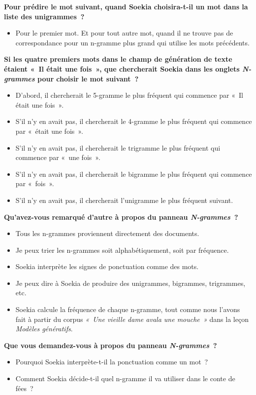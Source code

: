 \documentclass[12pt,a4paper]{article}
\begin{document}
\begin{thinkbox}
  \textbf{Pour prédire le mot suivant, quand Soekia choisira-t-il un mot dans la liste des unigrammes~?}
  \begin{itemize}
    \item Pour le premier mot. Et pour tout autre mot, quand il ne trouve pas de correspondance pour un n-gramme plus grand qui utilise les mots précédents.
  \end{itemize}

  \textbf{Si les quatre premiers mots dans le champ de génération de texte étaient «~Il était une fois~», que chercherait Soekia dans les onglets \emph{N-grammes} pour choisir le mot suivant~?}
  \begin{itemize}
    \item D'abord, il chercherait le 5-gramme le plus fréquent qui commence par «~Il était une fois~».
    \item S'il n'y en avait pas, il chercherait le 4-gramme le plus fréquent qui commence par «~était une fois~».
    \item S'il n'y en avait pas, il chercherait le trigramme le plus fréquent qui commence par «~une fois~».
    \item S'il n'y en avait pas, il chercherait le bigramme le plus fréquent qui commence par «~fois~».
    \item S'il n'y en avait pas, il chercherait l'unigramme le plus fréquent suivant.
  \end{itemize}

  \textbf{Qu'avez-vous remarqué d'autre à propos du panneau \emph{N-grammes}~?}
  \begin{itemize}
    \item Tous les n-grammes proviennent directement des documents.
    \item Je peux trier les n-grammes soit alphabétiquement, soit par fréquence.
    \item Soekia interprète les signes de ponctuation comme des mots.
    \item Je peux dire à Soekia de produire des unigrammes, bigrammes, trigrammes, etc.
    \item Soekia calcule la fréquence de chaque n-gramme, tout comme nous l'avons fait à partir du corpus \emph{«~Une vieille dame avala une mouche~»} dans la leçon \emph{Modèles génératifs}.
  \end{itemize}

  \textbf{Que vous demandez-vous à propos du panneau \emph{N-grammes}~?}
  \begin{itemize}
    \item Pourquoi Soekia interprète-t-il la ponctuation comme un mot~?
    \item Comment Soekia décide-t-il quel n-gramme il va utiliser dans le conte de fées~?
  \end{itemize}
\end{thinkbox}
\end{document}
